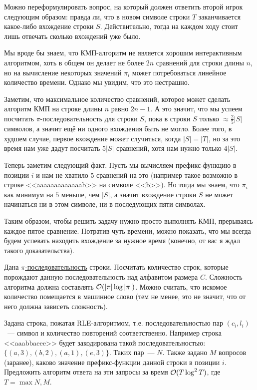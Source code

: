 \documentclass[addpoints]{exam}
\begin{document}
\begin{questions}
\begin{solution}

Можно переформулировать вопрос, на который должен ответить второй игрок следующим образом: правда ли, что в новом символе строки $T$ заканчивается какое-либо вхождение строки $S$. Действительно, тогда на каждом ходу стоит лишь отвечать сколько вхождений уже было.

Мы вроде бы знаем, что КМП-алгоритм не является хорошим интерактивным алгоритмом, хоть в общем он делает не более $2n$ сравнений для строки длины $n$, но на вычисление некоторых значений $\pi_{i}$ может потребоваться линейное количество времени. Однако мы увидим, что это нестрашно.

Заметим, что максимальное количество сравнений, которое может сделать алгоритм КМП на строке длины $n$ равно $2n - 1$. А это значит, что мы успеем посчитать $\pi$-последовательность для строки $S$, пока в строки $S$ только $\approx \frac{2}{5} |S|$ символов, а значит ещё ни одного вхождения быть не могло.
Более того, в худшем случае, первое вхождение может случиться, когда $|S| = |T|$, но за это время нам уже дадут посчитать $5|S|$ сравнений, хотя нам нужно только $4|S|$.

Теперь заметим следующий факт. Пусть мы вычисляем префикс-функцию в позиции $i$ и нам не хватило 5 сравнений на это (например такое возможно в строке <<aaaaaaaaaaaaab>> на символе <<b>>). Но тогда мы знаем, что $\pi_i$ как минимум на $5$ меньше, чем $|S|$, а значит вхождение строки $S$ не может начинаться ни в этом символе, ни в последующих пяти символах.

Таким образом, чтобы решить задачу нужно просто выполнять КМП, прерываясь каждое пятое сравнение. Потратив чуть времени, можно показать, что мы всегда будем успевать находить вхождение за нужное время (конечно, от вас я ждал такого доказательства).

\end{solution}

\question[1 \half] Дана \hyperref[piseq]{$\pi$-последовательность} строки. Посчитать количество строк, которые порождают данную последовательность над алфавитом размера $C$. Сложность алгоритма должна составлять $\mathcal{O}(|\pi| \log{|\pi|})$. Можно считать, что искомое количество помещается в машинное слово (тем не менее, это не значит, что от него должна зависеть сложность).

\question[1 \half] Задана строка, пожатая RLE-алгоритмом, т.е. последовательностью пар $(c_i, l_i)$~--- символ и количество повторений соответственно. Например строка <<aaabbaeee>> будет закодирована такой последовательностью: $\{(a, 3), (b,2), (a,1), (e,3)\}$. Таких пар~--- $N$. Также задано $M$ вопросов (заранее), каково значение префикс-функции данной строки в позиции $i$. Предложить алгоритм ответа на эти запросы за время $\mathcal{O}( T \log^2{T})$, где $T = \max{N,M}$. 


\end{questions}
\end{document}
